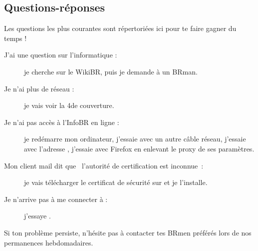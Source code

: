 \subsection{Questions-réponses}

Les questions les plus courantes sont répertoriées ici pour te faire gagner du temps !

\begin{description}

\item[J'ai une question sur l'informatique : ] je cherche sur le WikiBR, puis je demande à un BRman.

\item[Je n'ai plus de réseau : ] je vais voir la 4\ieme de couverture.

\item[Je n'ai pas accès à l'InfoBR en ligne : ] je redémarre mon ordinateur, j'essaie avec un autre câble réseau, j'essaie avec l'adresse , j'essaie avec Firefox en enlevant le proxy de ses paramètres.

\item[Mon client mail dit que \guillemotleft~l'autorité de certification est inconnue~\guillemotright : ] je vais télécharger le certificat de sécurité
sur  et je l'installe.


\item[Je n'arrive pas à me connecter à  : ] j'essaye .




\end{description}

Si ton problème persiste, n'hésite pas à contacter tes BRmen préférés lors de nos permanences hebdomadaires.